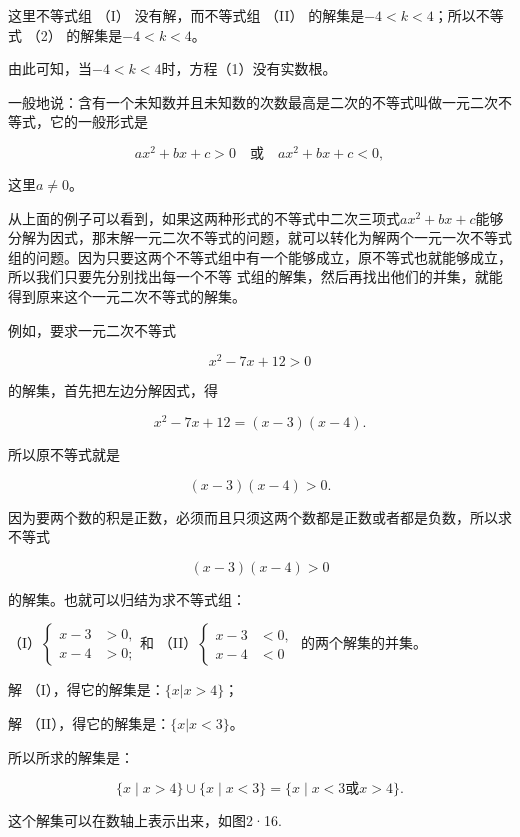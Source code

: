 这里不等式组 （I） 没有解，而不等式组 （II）
的解集是\(-4 < k < 4\)；所以不等式 （2） 的解集是\(-4 < k < 4\)。

由此可知，当\(-4 < k < 4\)时，方程（1）没有实数根。

一般地说：含有一个未知数并且未知数的次数最高是二次的不等式叫做一元二次不等式，它的一般形式是

\[
a x^{2} + b x + c > 0 \quad \text{或} \quad a x^{2} + b x + c < 0,
\]

这里\(a \neq 0\)。

从上面的例子可以看到，如果这两种形式的不等式中二次三项式\(ax^2 + bx + c\)能够分解为因式，那末解一元二次不等式的问题，就可以转化为解两个一元一次不等式组的问题。因为只要这两个不等式组中有一个能够成立，原不等式也就能够成立，所以我们只要先分别找出每一个不等
式组的解集，然后再找出他们的并集，就能得到原来这个一元二次不等式的解集。

例如，要求一元二次不等式

\[
x^{2} - 7 x + 12 > 0
\]

的解集，首先把左边分解因式，得

\[
x^{2} - 7 x + 12 = (x - 3) (x - 4).
\]

所以原不等式就是

\[
(x - 3) (x - 4) > 0. \tag {1}
\]

因为要两个数的积是正数，必须而且只须这两个数都是正数或者都是负数，所以求不等式

\[
(x - 3) (x - 4) > 0
\]

的解集。也就可以归结为求不等式组：

（I）\(\left\{\begin{aligned}x-3&>0,\\ x-4&>0;\end{aligned}\right.\)和
（II）\(\left\{\begin{aligned}x-3&<0,\\ x-4&<0\end{aligned}\right.\)
的两个解集的并集。

解 （I），得它的解集是：\(\{x|x>4\}\)；

解 （II），得它的解集是：\(\{x|x<3\}\)。

所以所求的解集是：

\[
\{x\mid x>4\}\cup\{x\mid x<3\} = \{x \mid x < 3 \text{或} x > 4 \}.
\]

这个解集可以在数轴上表示出来，如图2·16.

